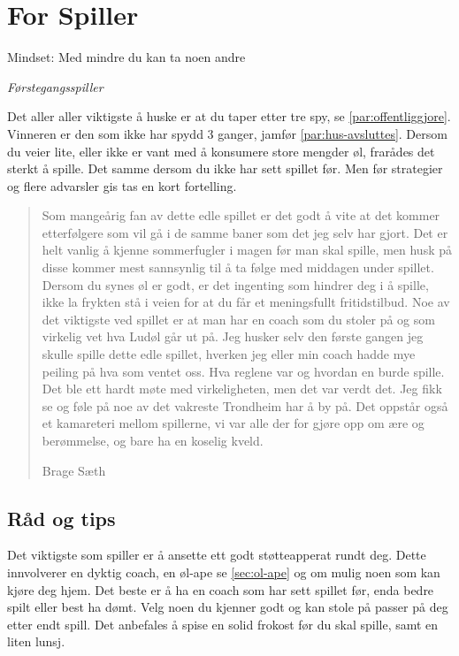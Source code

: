 \documentclass[10pt,a4paper,norsk,openany]{book}
\begin{document}
\chapter{For Spiller}

\epigraph{Mindset:  Med mindre du kan ta
  noen andre}{\textit{Førstegangsspiller}}

Det aller aller viktigste å huske er at du taper etter tre spy, se
\cref{par:offentliggjore}. Vinneren er den som ikke har spydd 3 ganger, jamfør
\cref{par:hus-avsluttes}. Dersom du veier lite, eller ikke er vant med å
konsumere store mengder øl, frarådes det sterkt å spille. Det samme dersom du
ikke har sett spillet før. Men før strategier og flere advarsler gis tas en kort
fortelling.

\blockquote[Brage Sæth]{%
  Som mangeårig fan av dette edle spillet er det godt å vite at det kommer
  etterfølgere som vil gå i de samme baner som det jeg selv har gjort. Det er
  helt vanlig å kjenne sommerfugler i magen før man skal spille, men husk på
  disse kommer mest sannsynlig til å ta følge med middagen under spillet. Dersom
  du synes øl er godt, er det ingenting som hindrer deg i å spille, ikke la
  frykten stå i veien for at du får et meningsfullt fritidstilbud. Noe av det
  viktigste ved spillet er at man har en coach som du stoler på og som virkelig
  vet hva Ludøl går ut på. Jeg husker selv den første gangen jeg skulle spille
  dette edle spillet, hverken jeg eller min coach hadde mye peiling på hva som
  ventet oss. Hva reglene var og hvordan en burde spille. Det ble ett hardt møte
  med virkeligheten, men det var verdt det. Jeg fikk se og føle på noe av det
  vakreste Trondheim har å by på. Det oppstår også et kamareteri mellom
  spillerne, vi var alle der for gjøre opp om ære og berømmelse, og bare ha en
  koselig kveld.}


\section{Råd og tips}

Det viktigste som spiller er å ansette ett godt støtteapperat rundt deg. Dette
innvolverer en dyktig coach, en øl-ape se \cref{sec:ol-ape} og om mulig noen som
kan kjøre deg hjem. Det beste er å ha en coach som har sett spillet før, enda
bedre spilt eller best ha dømt. Velg noen du kjenner godt og kan stole på passer
på deg etter endt spill. Det anbefales å spise en solid frokost før du skal
spille, samt en liten lunsj.
\end{document}
